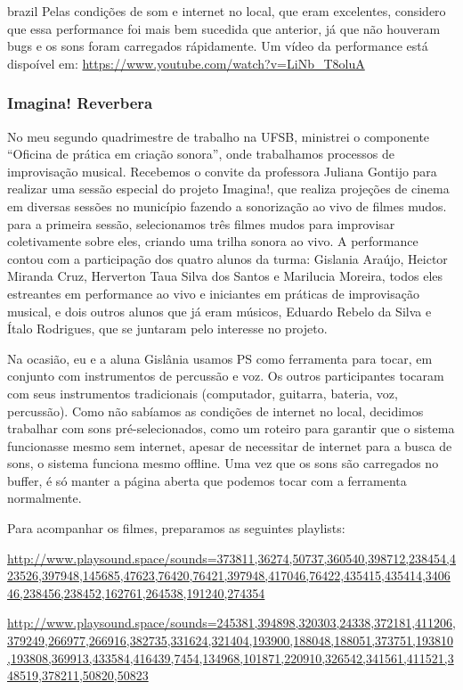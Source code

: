 \begin{otherlanguage*}{brazil}
Pelas condições de som e internet no local, que eram excelentes, considero que essa performance foi mais bem sucedida que anterior, já que não houveram bugs e os sons foram carregados rápidamente. Um vídeo da performance está dispoível em: \url{https://www.youtube.com/watch?v=LiNb_T8oluA}



\subsubsection{Imagina! Reverbera}

No meu segundo quadrimestre de trabalho na UFSB, ministrei o componente ``Oficina de prática em criação sonora'', onde trabalhamos processos de improvisação musical. Recebemos o convite da professora Juliana Gontijo para realizar uma sessão especial do projeto Imagina!, que realiza projeções de cinema em diversas sessões no município fazendo a sonorização ao vivo de filmes mudos. para a primeira sessão, selecionamos três filmes mudos para improvisar coletivamente sobre eles, criando uma trilha sonora ao vivo. A performance contou com a participação dos quatro alunos da turma: Gislania Araújo, Heictor Miranda Cruz, Herverton Taua Silva dos Santos e Marilucia Moreira, todos eles estreantes em performance ao vivo e iniciantes em práticas de improvisação musical, e dois outros alunos que já eram músicos, Eduardo Rebelo da Silva e Ítalo Rodrigues, que se juntaram pelo interesse no projeto. 

Na ocasião, eu e a aluna Gislânia usamos PS como ferramenta para tocar, em conjunto com instrumentos de percussão e voz. Os outros participantes tocaram com seus instrumentos tradicionais (computador, guitarra, bateria, voz, percussão). Como não sabíamos as condições de internet no local, decidimos trabalhar com sons pré-selecionados, como um roteiro para garantir que o sistema funcionasse mesmo sem internet, apesar de necessitar de internet para a busca de sons, o sistema funciona mesmo offline. Uma vez que os sons são carregados no buffer, é só manter a página aberta que podemos tocar com a ferramenta normalmente.

Para acompanhar os filmes, preparamos as seguintes playlists: 

\url{http://www.playsound.space/sounds=373811,36274,50737,360540,398712,238454,423526,397948,145685,47623,76420,76421,397948,417046,76422,435415,435414,340646,238456,238452,162761,264538,191240,274354}

\url{http://www.playsound.space/sounds=245381,394898,320303,24338,372181,411206,379249,266977,266916,382735,331624,321404,193900,188048,188051,373751,193810,193808,369913,433584,416439,7454,134968,101871,220910,326542,341561,411521,348519,378211,50820,50823}


\end{otherlanguage*}

